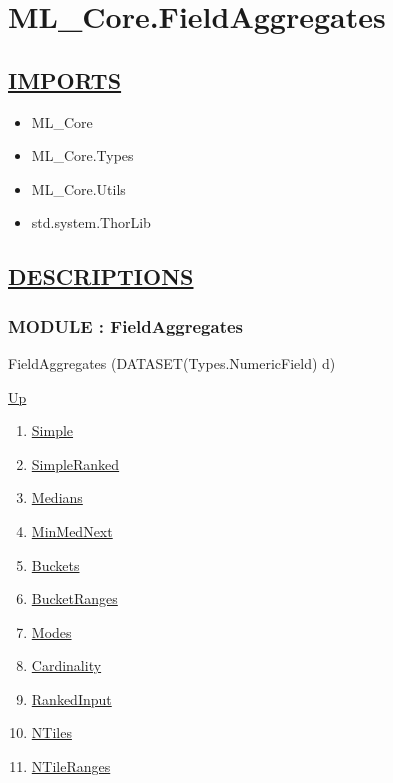 \chapter*{ML\_Core.FieldAggregates}
\hypertarget{ecldoc:toc:ML_Core.FieldAggregates}{}

\section*{\underline{IMPORTS}}
\begin{itemize}
\item ML\_Core
\item ML\_Core.Types
\item ML\_Core.Utils
\item std.system.ThorLib
\end{itemize}

\section*{\underline{DESCRIPTIONS}}
\subsection*{MODULE : FieldAggregates}
\hypertarget{ecldoc:ml_core.fieldaggregates}{}
\begin{minipage}[t]{\textwidth}
\begin{flushleft}
 FieldAggregates (DATASET(Types.NumericField) d)
\end{flushleft}
\end{minipage}
\hyperlink{ecldoc:toc:ML_Core}{Up}

\par
\par
\begin{enumerate}
\item \hyperlink{ecldoc:ml_core.fieldaggregates.simple}{Simple}
\item \hyperlink{ecldoc:ml_core.fieldaggregates.simpleranked}{SimpleRanked}
\item \hyperlink{ecldoc:ml_core.fieldaggregates.medians}{Medians}
\item \hyperlink{ecldoc:ml_core.fieldaggregates.minmednext}{MinMedNext}
\item \hyperlink{ecldoc:ml_core.fieldaggregates.buckets}{Buckets}
\item \hyperlink{ecldoc:ml_core.fieldaggregates.bucketranges}{BucketRanges}
\item \hyperlink{ecldoc:ml_core.fieldaggregates.modes}{Modes}
\item \hyperlink{ecldoc:ml_core.fieldaggregates.cardinality}{Cardinality}
\item \hyperlink{ecldoc:ml_core.fieldaggregates.rankedinput}{RankedInput}
\item \hyperlink{ecldoc:ml_core.fieldaggregates.ntiles}{NTiles}
\item \hyperlink{ecldoc:ml_core.fieldaggregates.ntileranges}{NTileRanges}
\end{enumerate}

